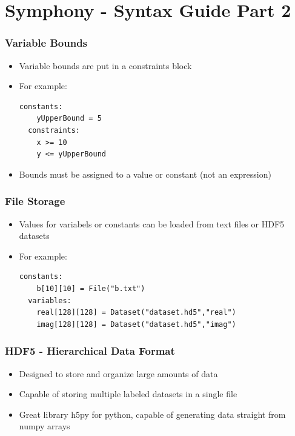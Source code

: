 \documentclass[presentation]{beamer}
\begin{document}
\section{Symphony - Syntax Guide Part 2}

\begin{frame}[fragile]
  \frametitle{Variable Bounds}
  \begin{itemize}
  \item Variable bounds are put in a {\color{red} constraints} block
  \item For example:
  \begin{lstlisting}[style=Haskell]
  constants:
    yUpperBound = 5  
  constraints:
    x >= 10
    y <= yUpperBound
  \end{lstlisting}
  \item Bounds must be assigned to a value or constant (not an expression)
  \end{itemize}
\end{frame}

\begin{frame}[fragile]
  \frametitle{File Storage}

  \begin{itemize}
    \item Values for variabels or constants can be loaded from text files or
      HDF5 datasets
    \item For example:
  \begin{lstlisting}[style=Haskell]
  constants:
    b[10][10] = File("b.txt")
  variables:
    real[128][128] = Dataset("dataset.hd5","real")
    imag[128][128] = Dataset("dataset.hd5","imag")
  \end{lstlisting}
  \end{itemize}
\end{frame}

\begin{frame}
  \frametitle{HDF5 - Hierarchical Data Format}
  \begin{itemize}
  \item Designed to store and organize large amounts of data
  \item Capable of storing multiple labeled datasets in a single file
  \item Great library {\color{blue}h5py} for python, capable of generating data
    straight from numpy arrays
  \end{itemize}
\end{frame}
\end{document}
